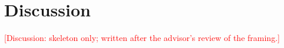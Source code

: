 \section{Discussion}\label{sec:discussion}
\textcolor{red}{[Discussion: skeleton only; written after the advisor's review of the framing.]}
